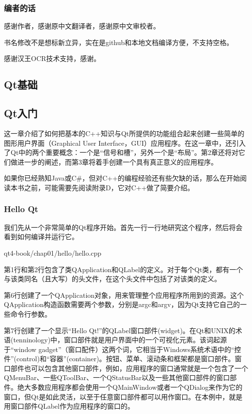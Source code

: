 \documentclass[11pt,oneside]{book}
\begin{document}
\begin{common-format}
\section*{编者的话}
感谢作者，感谢原中文翻译者，感谢原中文审校者。

书名修改不是想标新立异，实在是github和本地文档编译方便，不支持空格。

感谢汉王OCR技术支持，感谢\XeLaTeX 。





\end{common-format}


\setcounter{tocdepth}{2}
\tableofcontents

\begin{common-format}
\mainmatter


\part{Qt基础}
\chapter{Qt入门}
这一章介绍了如何把基本的C++知识与Qt所提供的功能组合起来创建一些简单的图形用户界面（Graphical User Interface，GUI）应用程序。在这一章中，还引入了Qt中的两个重要概念：一个是“信号和槽”，另外一个是“布局”。第2章还将对它们做进一步的阐述，而第3章将着手创建一个具有真正意义的应用程序。  

如果你已经熟知Java或C\#{}，但对C++的编程经验还有些欠缺的话，那么在开始阅读本书之前，可能需要先阅读附录D，它对C++做了简要介绍。

\section{Hello Qt}
我们先从一个非常简单的Qt程序开始。首先一行一行地研究这个程序，然后将会看到如何编译并运行它。

\begin{cppinput}{qt4-book/chap01/hello/hello.cpp}
\end{cppinput}


第1行和第2行包含了类QApplication和QLabel的定义。对于每个Qt类，都有一个与该类同名（且大写）的头文件，在这个头文件中包括了对该类的定义。

第6行创建了一个QApplication对象，用来管理整个应用程序所用到的资源。这个QApplication构造函数需要两个参数，分别是argc和argv，因为Qt支持它自己的一些命令行参数。

第7行创建了一个显示“Hello Qt!”的QLabel窗口部件(widget)。在Qt和UNIX的术语(tenninology)中，窗口部件就是用户界面中的一个可视化元素。该词起源于“window gadget”（窗口配件）这两个词，它相当于Windows系统术语中的“控件”(control)和“容器”(container)。按钮、菜单、滚动条和框架都是窗口部件。窗口部件也可以包含其他窗口部件，例如，应用程序的窗口通常就是一个包含了一个QMenuBar、一些QToolBar、一个QStatusBar以及一些其他窗口部件的窗口部件。绝大多数应用程序都会使用一个QMainWindow或者一个QDialog来作为它的窗口，但Qt是如此灵活，以至于任意窗口部件都可以用作窗口。在本例中，就是用窗口部件QLabel作为应用程序的窗口的。   


\end{common-format}
\end{document}
